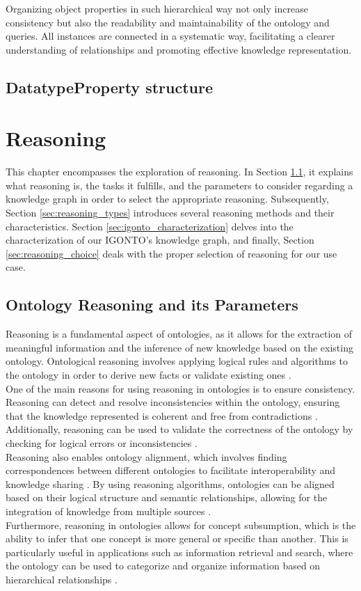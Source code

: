 \documentclass[
  a4paper,  %
  twoside,  %
  bibliography=totoc,
  headsepline,
  cleardoublepage=empty,
  parskip=half,
  draft=false
]{scrbook}
\begin{document}
Organizing object properties in such hierarchical way not only increase consistency but also the readability and maintainability of the ontology and queries. All instances are connected in a systematic way, facilitating a clearer understanding of relationships and promoting effective knowledge representation.

\subsection{DatatypeProperty structure}\label{sec:datatypeproperty_structure}

\section{Reasoning}
This chapter encompasses the exploration of reasoning. In Section \ref{sec:what_is_reasoning}, it explains what reasoning is, the tasks it fulfills, and the parameters to consider regarding a knowledge graph in order to select the appropriate reasoning. Subsequently, Section \ref{sec:reasoning_types} introduces several reasoning methods and their characteristics. Section \ref{sec:igonto_characterization} delves into the characterization of our IGONTO's knowledge graph, and finally, Section \ref{sec:reasoning_choice} deals with the proper selection of reasoning for our use case.


\subsection{Ontology Reasoning and its Parameters}\label{sec:what_is_reasoning}
Reasoning is a fundamental aspect of ontologies, as it allows for the extraction of meaningful information and the inference of new knowledge based on the existing ontology. Ontological reasoning involves applying logical rules and algorithms to the ontology in order to derive new facts or validate existing ones \cite{Tran.2008}.\\
One of the main reasons for using reasoning in ontologies is to ensure consistency. Reasoning can detect and resolve inconsistencies within the ontology, ensuring that the knowledge represented is coherent and free from contradictions \cite{Köhler.2011}. Additionally, reasoning can be used to validate the correctness of the ontology by checking for logical errors or inconsistencies \cite{Setiawan.2019}.\\
Reasoning also enables ontology alignment, which involves finding correspondences between different ontologies to facilitate interoperability and knowledge sharing \cite{Slater.2016}. By using reasoning algorithms, ontologies can be aligned based on their logical structure and semantic relationships, allowing for the integration of knowledge from multiple sources \cite{Li.2015}.\\
Furthermore, reasoning in ontologies allows for concept subsumption, which is the ability to infer that one concept is more general or specific than another. This is particularly useful in applications such as information retrieval and search, where the ontology can be used to categorize and organize information based on hierarchical relationships \cite{Qing.2009}.
\end{document}
